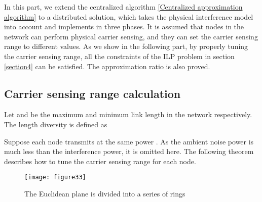 \documentclass[conference]{IEEEtran}
\begin{document}
In this part,  we extend the centralized algorithm \ref{Centralized
approximation algorithm} to a distributed solution, which takes the
physical interference model into account and implements in three
phases. It is assumed that nodes in the network can perform physical
carrier sensing, and they can set the carrier sensing range to
different values. As we show in the following part, by properly
tuning the carrier sensing range, all the constraints of the ILP
problem in section \ref{section4} can be satisfied. The
approximation ratio is also proved.

\subsection{Carrier sensing range calculation}
Let  and  be the maximum and minimum link length
in the network respectively. The length diversity  is defined as

Suppose each node transmits at the same power . As the ambient
noise power is much less than the interference power, it is omitted
here. The following theorem describes how to tune the carrier
sensing range for each node.
\begin{figure}[!h]
\centering
\texttt{[image: figure33]}
\caption{The Euclidean plane is divided into a series of rings}
\label{Fig:the Euclidean plane is divided into a series of rings}
\end{figure}
\end{document}
